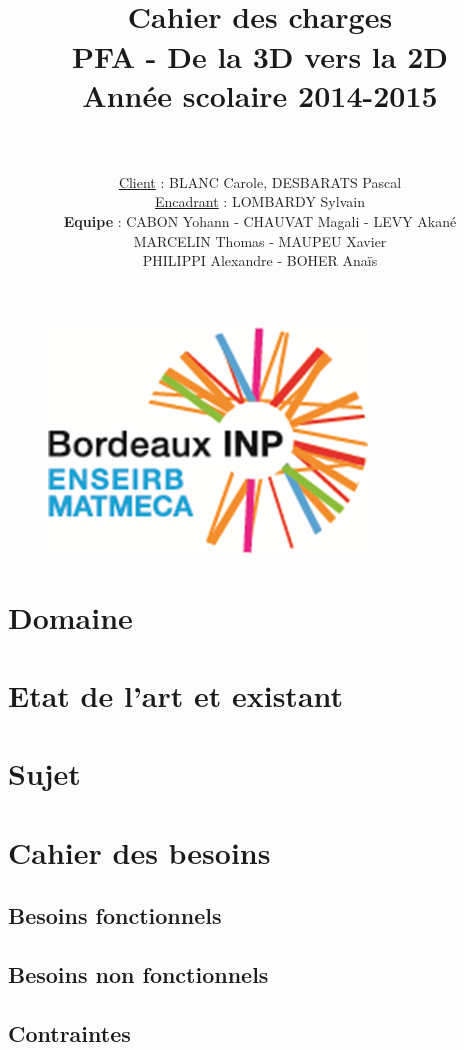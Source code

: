 \documentclass[paper=a4, fontsize=11pt]{scrartcl}
\title{
		\usefont{OT1}{bch}{b}{n}
		\horrule{1.5pt} \\[0.5cm]	
		\Huge \textbf{Cahier des charges} \\ [10pt]
		\Huge PFA - De la 3D vers la 2D \\ [15pt]
		\LARGE Année scolaire 2014-2015 \\ 
		\horrule{1.5pt} \\[0.5cm]
}
\author{
		\huge \underline{Client} : \LARGE BLANC Carole, DESBARATS Pascal\\ [10pt] 
		\huge \underline{Encadrant} : \LARGE LOMBARDY Sylvain\\[20pt]
				\normalfont 							
        \huge \textbf{Equipe} : \Large CABON Yohann - CHAUVAT Magali - LEVY Akané \\[5pt]
        MARCELIN Thomas - MAUPEU Xavier\\[5pt]
        PHILIPPI Alexandre - BOHER Anaïs\\[10pt]		\normalsize
}
\date{}
\numberwithin{equation}{section}		%
\numberwithin{figure}{section}			%
\numberwithin{table}{section}				%
\begin{document}
\maketitle

\begin{figure}[b]
\centering\includegraphics{logo.png}
\end{figure}

\newpage

\tableofcontents

\newpage

\section{Domaine}


\section{Etat de l'art et existant}


\section{Sujet}


\section{Cahier des besoins}
\subsection{Besoins fonctionnels}

\subsection{Besoins non fonctionnels}

\subsection{Contraintes}

\end{document}
